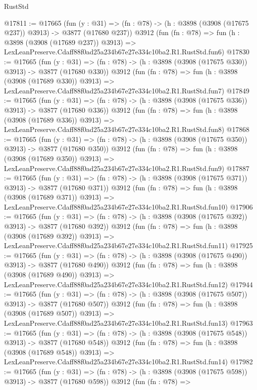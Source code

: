 \begin{lexlean}{RustStd}
\begin{coremodule}
@17811 := @17665
    (fun (y : @31) => (fn : @78) -> (h : @3898 (@3908 (@17675 @237)) @3913) -> @3877 (@17680 @237))
    @3912
    (fun (fn : @78) =>
    fun (h : @3898 (@3908 (@17689 @237)) @3913) =>
    LexLeanPreserve.Cdaff88f0ad25a234b67e27e334c10ba2.R1.RustStd.fun6)
@17830 := @17665
    (fun (y : @31) => (fn : @78) -> (h : @3898 (@3908 (@17675 @330)) @3913) -> @3877 (@17680 @330))
    @3912
    (fun (fn : @78) =>
    fun (h : @3898 (@3908 (@17689 @330)) @3913) =>
    LexLeanPreserve.Cdaff88f0ad25a234b67e27e334c10ba2.R1.RustStd.fun7)
@17849 := @17665
    (fun (y : @31) => (fn : @78) -> (h : @3898 (@3908 (@17675 @336)) @3913) -> @3877 (@17680 @336))
    @3912
    (fun (fn : @78) =>
    fun (h : @3898 (@3908 (@17689 @336)) @3913) =>
    LexLeanPreserve.Cdaff88f0ad25a234b67e27e334c10ba2.R1.RustStd.fun8)
@17868 := @17665
    (fun (y : @31) => (fn : @78) -> (h : @3898 (@3908 (@17675 @350)) @3913) -> @3877 (@17680 @350))
    @3912
    (fun (fn : @78) =>
    fun (h : @3898 (@3908 (@17689 @350)) @3913) =>
    LexLeanPreserve.Cdaff88f0ad25a234b67e27e334c10ba2.R1.RustStd.fun9)
@17887 := @17665
    (fun (y : @31) => (fn : @78) -> (h : @3898 (@3908 (@17675 @371)) @3913) -> @3877 (@17680 @371))
    @3912
    (fun (fn : @78) =>
    fun (h : @3898 (@3908 (@17689 @371)) @3913) =>
    LexLeanPreserve.Cdaff88f0ad25a234b67e27e334c10ba2.R1.RustStd.fun10)
@17906 := @17665
    (fun (y : @31) => (fn : @78) -> (h : @3898 (@3908 (@17675 @392)) @3913) -> @3877 (@17680 @392))
    @3912
    (fun (fn : @78) =>
    fun (h : @3898 (@3908 (@17689 @392)) @3913) =>
    LexLeanPreserve.Cdaff88f0ad25a234b67e27e334c10ba2.R1.RustStd.fun11)
@17925 := @17665
    (fun (y : @31) => (fn : @78) -> (h : @3898 (@3908 (@17675 @490)) @3913) -> @3877 (@17680 @490))
    @3912
    (fun (fn : @78) =>
    fun (h : @3898 (@3908 (@17689 @490)) @3913) =>
    LexLeanPreserve.Cdaff88f0ad25a234b67e27e334c10ba2.R1.RustStd.fun12)
@17944 := @17665
    (fun (y : @31) => (fn : @78) -> (h : @3898 (@3908 (@17675 @507)) @3913) -> @3877 (@17680 @507))
    @3912
    (fun (fn : @78) =>
    fun (h : @3898 (@3908 (@17689 @507)) @3913) =>
    LexLeanPreserve.Cdaff88f0ad25a234b67e27e334c10ba2.R1.RustStd.fun13)
@17963 := @17665
    (fun (y : @31) => (fn : @78) -> (h : @3898 (@3908 (@17675 @548)) @3913) -> @3877 (@17680 @548))
    @3912
    (fun (fn : @78) =>
    fun (h : @3898 (@3908 (@17689 @548)) @3913) =>
    LexLeanPreserve.Cdaff88f0ad25a234b67e27e334c10ba2.R1.RustStd.fun14)
@17982 := @17665
    (fun (y : @31) => (fn : @78) -> (h : @3898 (@3908 (@17675 @598)) @3913) -> @3877 (@17680 @598))
    @3912
    (fun (fn : @78) =>

\end{coremodule}
\end{lexlean}
